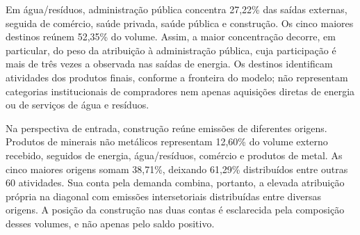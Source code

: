 Em água/resíduos, administração pública concentra 27,22\% das saídas externas, seguida de comércio, saúde privada, saúde pública e construção. Os cinco maiores destinos reúnem 52,35\% do volume. Assim, a maior concentração decorre, em particular, do peso da atribuição à administração pública, cuja participação é mais de três vezes a observada nas saídas de energia. Os destinos identificam atividades dos produtos finais, conforme a fronteira do modelo; não representam categorias institucionais de compradores nem apenas aquisições diretas de energia ou de serviços de água e resíduos.

Na perspectiva de entrada, construção reúne emissões de diferentes origens. Produtos de minerais não metálicos representam 12,60\% do volume externo recebido, seguidos de energia, água/resíduos, comércio e produtos de metal. As cinco maiores origens somam 38,71\%, deixando 61,29\% distribuídos entre outras 60 atividades. Sua conta pela demanda combina, portanto, a elevada atribuição própria na diagonal com emissões intersetoriais distribuídas entre diversas origens. A posição da construção nas duas contas é esclarecida pela composição desses volumes, e não apenas pelo saldo positivo.

